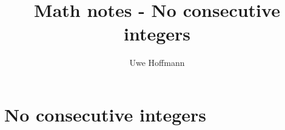 

\title{Math notes - No consecutive integers}
\author{Uwe Hoffmann}



\setcounter{chapter}{1}
\chapter*{No consecutive integers}
